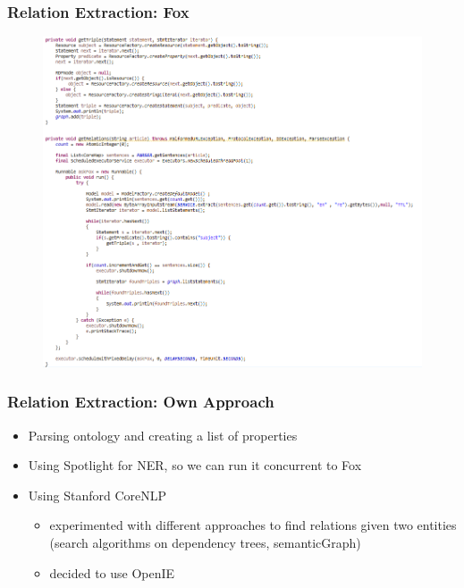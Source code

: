 \documentclass{beamer}
\begin{document}

\begin{frame}
\frametitle{Relation Extraction: Fox}

\begin{figure}
	\begin{center}
		\includegraphics[scale=0.38]{FoxExtraction.PNG}
	\end{center}
\end{figure}
\end{frame}


\begin{frame}
\frametitle{Relation Extraction: Own Approach}
\begin{itemize}
	\item Parsing ontology and creating a list of properties
	\item Using Spotlight for NER, so we can run it concurrent to Fox
	\item Using Stanford CoreNLP 
	\begin{itemize}
		\item experimented with different approaches to find relations given two entities (search algorithms on dependency trees, semanticGraph)
		\item decided to use OpenIE
	\end{itemize}
\end{itemize}
\end{frame}
\end{document}
